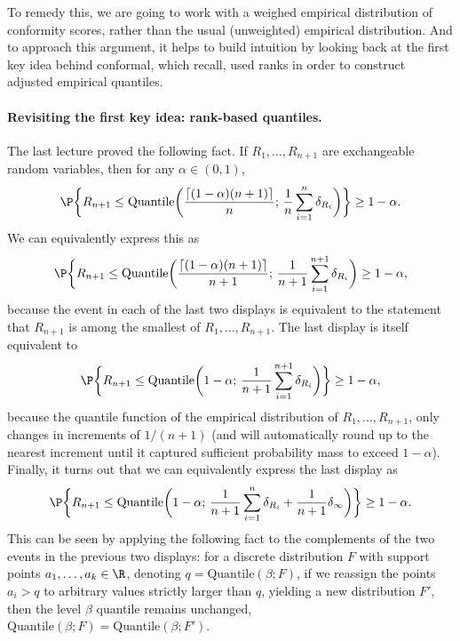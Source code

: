 \documentclass{article}
\begin{document}
To remedy this, we are going to work with a weighed empirical distribution of 
conformity scores, rather than the usual (unweighted) empirical distribution. 
And to approach this argument, it helps to build intuition by looking back at
the first key idea behind conformal, which recall, used ranks in order to
construct adjusted empirical quantiles. 

\paragraph{Revisiting the first key idea: rank-based quantiles.}

\def\Quantile{\mathrm{Quantile}}

The last lecture proved the following fact. If $R_1,\dots,R_{n+1}$ are
exchangeable random variables, then for any $\alpha \in (0,1)$, 
\[
\P\bigg\{ R_{n+1} \leq \Quantile\bigg( \frac{\lceil (1-\alpha)(n+1) \rceil}{n};
\, \frac{1}{n} \sum_{i=1}^n \delta_{R_i} \bigg) \bigg\} \geq 1-\alpha.
\]
We can equivalently express this as
\[
\P\bigg\{ R_{n+1} \leq \Quantile\bigg( \frac{\lceil (1-\alpha)(n+1) \rceil}{n+1}; 
\, \frac{1}{n+1} \sum_{i=1}^{n+1} \delta_{R_i} \bigg) \geq 1-\alpha,
\]
because the event in each of the last two displays is equivalent to the
statement that $R_{n+1}$ is among the 
smallest of $R_1,\dots,R_{n+1}$. The last display is itself equivalent to
\[
\P\bigg\{ R_{n+1} \leq \Quantile\bigg( 1-\alpha; \, \frac{1}{n+1}
\sum_{i=1}^{n+1} \delta_{R_i} \bigg) \bigg\} \geq 1-\alpha, 
\]
because the quantile function of the empirical distribution of
$R_1,\dots,R_{n+1}$, only changes in increments of $1/(n+1)$ (and will
automatically round up to the nearest increment until it captured sufficient
probability mass to exceed $1-\alpha$). Finally, it turns out that we can
equivalently express the last display as  
\begin{equation}
\label{eq:quantile}
\P\bigg\{ R_{n+1} \leq \Quantile\bigg( 1-\alpha; \, \frac{1}{n+1} \sum_{i=1}^n
\delta_{R_i} + \frac{1}{n+1} \delta_\infty \bigg) \bigg\} \geq 1-\alpha.
\end{equation}
This can be seen by applying the following fact to the complements of the two
events in the previous two displays: for a discrete distribution $F$ with
support points $a_1,\dots,a_k \in \R$, denoting $q=\Quantile(\beta; F)$, if we
reassign the points $a_i > q$ to arbitrary values strictly larger than $q$,
yielding a new distribution $F'$, then the level $\beta$ quantile remains
unchanged, $\Quantile(\beta; F) = \Quantile(\beta; F')$.  
\end{document}

